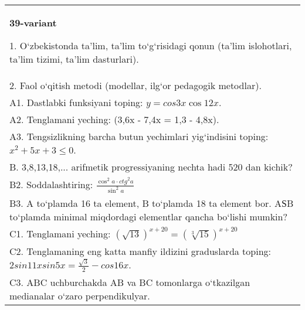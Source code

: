\documentclass{article}
\begin{document}
\begin{tabular}{m{17cm}}
\textbf{39-variant}

1. O‘zbekistonda ta’lim, ta’lim to‘g‘risidagi qonun (ta’lim islohotlari, ta’lim tizimi, ta’lim dasturlari). \\
2. Faol o‘qitish metodi (modellar, ilg‘or pedagogik metodlar). \\
A1. Dastlabki funksiyani toping: \(y=cos{3x}\cos{12x}\). \\
A2. Tenglamani yeching: (3,6x - 7,4x = 1,3 - 4,8x). \\
A3. Tengsizlikning barcha butun yechimlari yig‘indisini toping: \(x^2 + 5x + 3 \leq 0\). \\
B. 3,8,13,18,... arifmetik progressiyaning nechta hadi 520 dan kichik? \\
B2. Soddalashtiring: \(\frac{\cos^{2}a \cdot {ctg}^{2}a}{\sin^{2}a}\) \\
B3. A to‘plamda 16 ta element, B to‘plamda 18 ta element bor. AЅB to‘plamda minimal miqdordagi elementlar qancha bo‘lishi mumkin? \\
C1. Tenglamani yeching: \((\sqrt{13}) ^{x + 20} = (\sqrt[3]{15}) ^{x + 20}\) \\
C2. Tenglamaning eng katta manfiy ildizini graduslarda toping: \(2sin11xsin5x = \frac{\sqrt{3}}{2} - cos16x\). \\
C3. ABC uchburchakda AB va BC tomonlarga o‘tkazilgan medianalar o‘zaro perpendikulyar. \\

\end{tabular}
\vspace{1cm}
\end{document}
